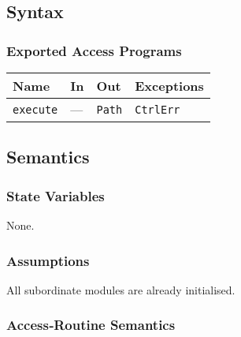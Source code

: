 \documentclass[12pt, titlepage]{article}
\begin{document}
\subsection{Syntax}
\subsubsection{Exported Access Programs}
\begin{center}
\renewcommand{\arraystretch}{1.3}
\begin{tabular}{p{3.2cm} p{4cm} p{3cm} p{3cm}}
\toprule
\textbf{Name} & \textbf{In} & \textbf{Out} & \textbf{Exceptions}\\ \midrule
\texttt{execute} & --- & \texttt{Path} & \texttt{CtrlErr}\\
\bottomrule
\end{tabular}
\end{center}

\subsection{Semantics}
\subsubsection{State Variables}
None.

\subsubsection{Assumptions}
All subordinate modules are already initialised.

\subsubsection{Access‑Routine Semantics}
\end{document}
